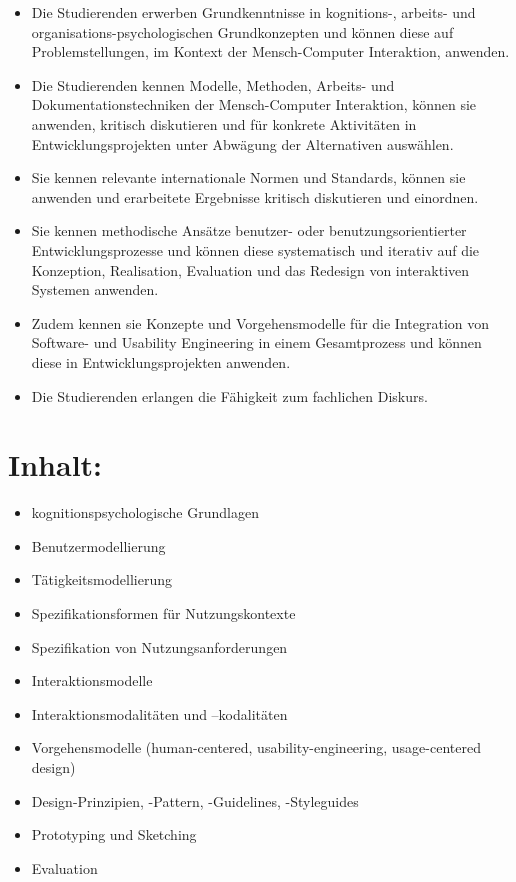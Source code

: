 \begin{itemize}
\tightlist
\item
  Die Studierenden erwerben Grundkenntnisse in kognitions-, arbeits- und
  organisations-psychologischen Grundkonzepten und können diese auf
  Problemstellungen, im Kontext der Mensch-Computer Interaktion,
  anwenden.
\item
  Die Studierenden kennen Modelle, Methoden, Arbeits- und
  Dokumentationstechniken der Mensch-Computer Interaktion, können sie
  anwenden, kritisch diskutieren und für konkrete Aktivitäten in
  Entwicklungsprojekten unter Abwägung der Alternativen auswählen.
\item
  Sie kennen relevante internationale Normen und Standards, können sie
  anwenden und erarbeitete Ergebnisse kritisch diskutieren und
  einordnen.
\item
  Sie kennen methodische Ansätze benutzer- oder benutzungsorientierter
  Entwicklungsprozesse und können diese systematisch und iterativ auf
  die Konzeption, Realisation, Evaluation und das Redesign von
  interaktiven Systemen anwenden.
\item
  Zudem kennen sie Konzepte und Vorgehensmodelle für die Integration von
  Software- und Usability Engineering in einem Gesamtprozess und können
  diese in Entwicklungsprojekten anwenden.
\item
  Die Studierenden erlangen die Fähigkeit zum fachlichen Diskurs.
\end{itemize}

\section*{Inhalt:}\label{inhalt-15}

\begin{itemize}
\tightlist
\item
  kognitionspsychologische Grundlagen
\item
  Benutzermodellierung
\item
  Tätigkeitsmodellierung
\item
  Spezifikationsformen für Nutzungskontexte
\item
  Spezifikation von Nutzungsanforderungen
\item
  Interaktionsmodelle
\item
  Interaktionsmodalitäten und --kodalitäten
\item
  Vorgehensmodelle (human-centered, usability-engineering,
  usage-centered design)
\item
  Design-Prinzipien, -Pattern, -Guidelines, -Styleguides
\item
  Prototyping und Sketching
\item
  Evaluation
\end{itemize}

